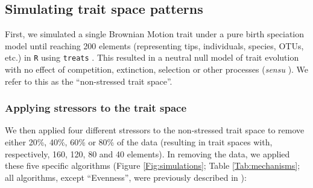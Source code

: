\documentclass[12pt,letterpaper]{article}
\begin{document}
\subsection{Simulating trait space patterns}

First, we simulated a single Brownian Motion trait under a pure birth speciation model until reaching 200 elements (representing tips, individuals, species, OTUs, etc.) in \texttt{R} \citep{rcore} using \texttt{treats} \citep{guillerme2024treats}.
This resulted in a neutral null model of trait evolution with no effect of competition, extinction, selection or other processes (\textit{sensu} \citealt{bausman2018modeling}).
We refer to this as the ``non-stressed trait space''.

\subsubsection{Applying stressors to the trait space}

We then applied four different stressors to the non-stressed trait space to remove either 20\%, 40\%, 60\% or 80\% of the data (resulting in trait spaces with, respectively, 160, 120, 80 and 40 elements).
In removing the data, we applied these five specific algorithms (Figure \ref{Fig:simulations}; Table \ref{Tab:mechanisms}; all algorithms, except ``Evenness'', were previously described in \cite{guillerme2020shifting}):
\end{document}
